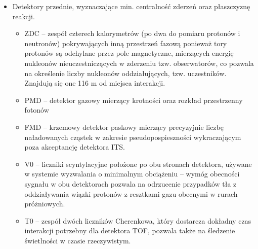 \begin{itemize}
	\item Detektory przednie, wyznaczające min. centralność zderzeń oraz płaszczyznę reakcji.
	\begin{itemize}
		\item ZDC -- zespół czterech kalorymetrów (po dwa do pomiaru protonów i neutronów) pokrywających inną przestrzeń fazową ponieważ tory protonów są odchylane przez pole magnetyczne, mierzących energię nukleonów nieuczestniczących w zderzeniu tzw. obserwatorów, co pozwala na określenie liczby nukleonów oddziałujących, tzw. uczestników. Znajdują się one 116 m od miejsca interakcji.
		\item PMD -- detektor gazowy mierzący krotności oraz rozkład przestrzenny fotonów
		\item FMD -- krzemowy detektor paskowy mierzący precyzyjnie liczbę naładowanych cząstek w zakresie pseudopospieszności wykraczającym poza akceptancję detektora ITS.
		\item V0 -- liczniki scyntylacyjne położone po obu stronach detektora, używane w systemie wyzwalania o minimalnym obciążeniu  -- wymóg obecności sygnału w obu detektorach pozwala na odrzucenie przypadków tła z oddziaływania wiązki protonów z resztkami gazu obecnymi w rurach próżniowych.
		\item T0 -- zespół dwóch liczników Cherenkowa, który dostarcza dokładny czas interakcji potrzebny dla detektora TOF, pozwala także na śledzenie świetlności w czasie rzeczywistym.
	\end{itemize}
\end{itemize}






